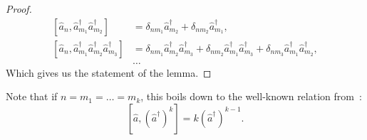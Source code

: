 \begin{proof}
\begin{equation*}
\begin{split}
	[ \hat{a}_n, \hat{a}_{m_1}^\dagger \hat{a}_{m_2}^\dagger ]
	& = \delta_{n m_1} \hat{a}_{m_2}^\dagger + \delta_{n m_2} \hat{a}_{m_1}^\dagger, \\
	[ \hat{a}_n, \hat{a}_{m_1}^\dagger \hat{a}_{m_2}^\dagger \hat{a}_{m_3}^\dagger ]
	& = \delta_{n m_1} \hat{a}_{m_2}^\dagger \hat{a}_{m_3}^\dagger
	+ \delta_{n m_2} \hat{a}_{m_1}^\dagger \hat{a}_{m_3}^\dagger
	+ \delta_{n m_3} \hat{a}_{m_1}^\dagger \hat{a}_{m_2}^\dagger, \\
	& \ldots
\end{split}
\end{equation*}
Which gives us the statement of the lemma.
\end{proof}

Note that if $n = m_1 = \ldots = m_k$, this boils down to the well-known relation from~\cite{Louisell1990}:
\[
	[ \hat{a}, (\hat{a}^\dagger)^k ] = k (\hat{a}^\dagger)^{k-1}.
\]
